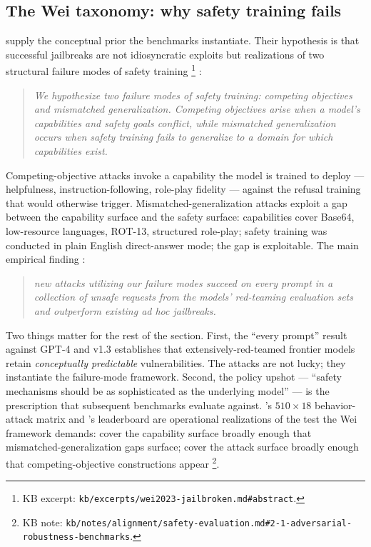 \subsection{The Wei taxonomy: why safety training fails}
\label{sec:safety-wei}

\citet{wei2023-jailbroken} supply the conceptual prior the
benchmarks instantiate. Their hypothesis is that successful
jailbreaks are not idiosyncratic exploits but realizations of two
structural failure modes of safety training%
\footnote{KB excerpt: \nolinkurl{kb/excerpts/wei2023-jailbroken.md#abstract}.}
\citep[\S{}abstract]{wei2023-jailbroken}:

\begin{quote}\itshape
We hypothesize two failure modes of safety training: \emph{competing
objectives} and \emph{mismatched generalization}. Competing
objectives arise when a model's capabilities and safety goals
conflict, while mismatched generalization occurs when safety
training fails to generalize to a domain for which capabilities
exist.
\end{quote}

Competing-objective attacks invoke a capability the model is
trained to deploy --- helpfulness, instruction-following, role-play
fidelity --- against the refusal training that would otherwise
trigger. Mismatched-generalization attacks exploit a gap between
the capability surface and the safety surface: capabilities cover
Base64, low-resource languages, ROT-13, structured role-play; safety
training was conducted in plain English direct-answer mode; the gap
is exploitable. The main empirical finding
\citep[\S{}abstract]{wei2023-jailbroken}:

\begin{quote}\itshape
new attacks utilizing our failure modes succeed on every prompt in
a collection of unsafe requests from the models' red-teaming
evaluation sets and outperform existing ad hoc jailbreaks.
\end{quote}

Two things matter for the rest of the section. First, the
``every prompt'' result against GPT-4 and  v1.3 establishes
that extensively-red-teamed frontier models retain
\emph{conceptually predictable} vulnerabilities. The attacks are
not lucky; they instantiate the failure-mode framework. Second,
the policy upshot --- ``safety mechanisms should be as sophisticated
as the underlying model''
\citep[\S{}abstract]{wei2023-jailbroken} --- is the
\emph{} prescription that subsequent
benchmarks evaluate against. 's $510 \times 18$ behavior-
attack matrix and 's leaderboard are operational
realizations of the test the Wei framework demands: cover the
capability surface broadly enough that mismatched-generalization
gaps surface; cover the attack surface broadly enough that
competing-objective constructions appear%
\footnote{KB note: \nolinkurl{kb/notes/alignment/safety-evaluation.md#2-1-adversarial-robustness-benchmarks}.}.

